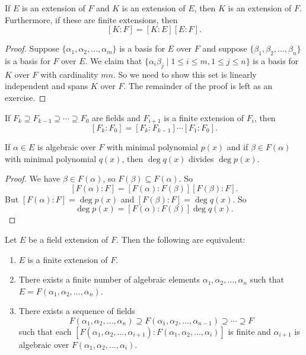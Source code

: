 \begin{theorem}
	If $E$ is an extension of $F$ and $K$ is an extension of $E$, then $K$ is an extension of $F$. Furthermore, if these are finite extensions, then
	$$[K:F]=[K:E][E:F].$$
\end{theorem}

\begin{proof}
	Suppose $\{\alpha_1,\alpha_2,\hdots,\alpha_m\}$ is a basis for $E$ over $F$ and suppose $\{\beta_1,\beta_2,\hdots,\beta_n\}$ is a basis for $F$ over $E$. We claim that $\{\alpha_i\beta_j\mid 1\leq i\leq m,1\leq j\leq n\}$ is a basis for $K$ over $F$ with cardinality $mn$. So we need to show this set is linearly independent and spans $K$ over $F$. The remainder of the proof is left as an exercise.
\end{proof}

\begin{corollary}
	If $F_k\supseteq F_{k-1}\supseteq \cdots\supseteq F_0$ are fields and $F_{i+1}$ is a finite extension of $F_i$, then
	$$[F_k:F_0]=[F_k:F_{k-1}]\cdots[F_1:F_0].$$
\end{corollary}

\begin{corollary}
	If $\alpha\in E$ is algebraic over $F$ with minimal polynomial $p(x)$ and if $\beta\in F(\alpha)$ with minimal polynomial $q(x)$, then $\deg q(x)$ divides $\deg p(x)$.
\end{corollary}

\begin{proof}
	We have $\beta\in F(\alpha)$, so $F(\beta)\subseteq F(\alpha)$. So
	$$[F(\alpha):F]=[F(\alpha):F(\beta)][F(\beta):F].$$
	But $[F(\alpha):F]=\deg p(x)$ and $[F(\beta):F]=\deg q(x)$. So
	$$\deg p(x)=[F(\alpha):F(\beta)]\deg q(x).$$
\end{proof}

\begin{theorem}
	Let $E$ be a field extension of $F$. Then the following are equivalent:
	\begin{enumerate}
		\item $E$ is a finite extension of $F$.
		\item There exists a finite number of algebraic elements $\alpha_1,\alpha_2,\hdots,\alpha_n$ such that $E=F(\alpha_1,\alpha_2,\hdots,\alpha_n)$.
		\item There exists a sequence of fields
		$$F(\alpha_1,\alpha_2,\hdots,\alpha_n)\supseteq F(\alpha_1,\alpha_2,\hdots,\alpha_{n-1})\supseteq\cdots\supseteq F$$
		such that each $[F(\alpha_1,\alpha_2,\hdots,\alpha_{i+1}):F(\alpha_1,\alpha_2,\hdots,\alpha_i)]$ is finite and $\alpha_{i+1}$ is algebraic over $F(\alpha_1,\alpha_2,\hdots,\alpha_i)$.
	\end{enumerate}
\end{theorem}

